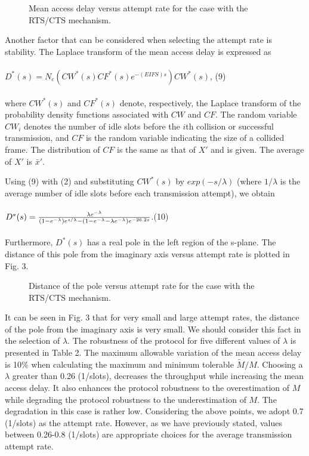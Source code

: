 \documentclass[10pt,twocolumn,oneside,submit]{JCNtran}
\begin{document}
\begin{figure}[t]
\begin{center}
\epsfxsize=8cm \leavevmode{} \caption{Mean access delay versus attempt rate for the case with the RTS/CTS mechanism.} \label{fig:2}
\end{center}
\end{figure}
\par Another factor that can be considered when selecting the attempt rate is stability. The Laplace transform of the mean access delay is expressed as\\
\\
$D^*(s)=N_c(CW^*(s)CF^*(s)e^{-(EIFS)s})CW^*(s)$, \hfill(9) \\
\\
where $CW^*(s)$ and $CF^*(s)$ denote, respectively, the Laplace transform of the probability density functions associated with $CW$ and $CF$. The random variable $CW_i$ denotes the number of idle slots before the $i$th collision or successful transmission, and $CF$ is the random variable indicating the size of a collided frame. The distribution of $CF$ is the same as that of $X'$ and is given. The average of $X'$ is $\bar x'$.
\par Using (9) with (2) and substituting $CW^*(s)$ by $exp(-s/\lambda )$ (where $1/\lambda $ is the average number of idle slots before each transmission attempt), we obtain\\
\\
$D^*(s)={\lambda e^{-\lambda }\over(1-e^{-\lambda })e^{s/\lambda }-(1-e^{-\lambda }-\lambda e^{-\lambda })e^{-26.2s}}$.\hfill(10) \\
\\
Furthermore, $D^*(s)$ has a real pole in the left region of the s-plane. The distance of this pole from the imaginary axis versus attempt rate is plotted in Fig. 3.
\begin{figure}[t]
\begin{center}
\epsfxsize=8cm \leavevmode{} \caption{Distance of the pole versus attempt rate for the case with the RTS/CTS mechanism.} \label{fig:3}
\end{center}
\end{figure}
It can be seen in Fig. 3 that for very small and large attempt rates, the distance of the pole from the imaginary axis is very small. We should consider this fact in the selection of $\lambda $. The robustness of the protocol for five different values of $\lambda $ is presented in Table 2. The maximum allowable variation of the mean access delay is 10\% when calculating the maximum and minimum tolerable $\tilde {M}/M$. Choosing a $\lambda $ greater than 0.26 (1/slots), decreases the throughput while increasing the mean access delay. It also enhances the protocol robustness to the overestimation of $M$ while degrading the protocol robustness to the underestimation of $M$. The degradation in this case is rather low. Considering the above points, we adopt 0.7 (1/slots) as the attempt rate. However, as we have previously stated, values between 0.26-0.8 (1/slots) are appropriate choices for the average transmission attempt rate.
\end{document}
